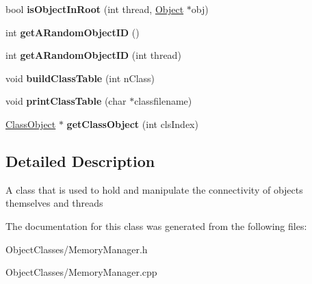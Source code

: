 \begin{DoxyCompactItemize}
\item 
\hypertarget{classtrace_gen_1_1_memory_manager_ae096928d0f0042ed5a44a7540dd36914}{}bool {\bfseries is\+Object\+In\+Root} (int thread, \hyperlink{classtrace_gen_1_1_object}{Object} $\ast$obj)\label{classtrace_gen_1_1_memory_manager_ae096928d0f0042ed5a44a7540dd36914}

\item 
\hypertarget{classtrace_gen_1_1_memory_manager_a8ec4d8aebc6678927dcabe19b6158449}{}int {\bfseries get\+A\+Random\+Object\+I\+D} ()\label{classtrace_gen_1_1_memory_manager_a8ec4d8aebc6678927dcabe19b6158449}

\item 
\hypertarget{classtrace_gen_1_1_memory_manager_a12c8c473bbe62e7c7b0f373c6c698094}{}int {\bfseries get\+A\+Random\+Object\+I\+D} (int thread)\label{classtrace_gen_1_1_memory_manager_a12c8c473bbe62e7c7b0f373c6c698094}

\item 
\hypertarget{classtrace_gen_1_1_memory_manager_a5626579f1a635a2d30fb37a326fed067}{}void {\bfseries build\+Class\+Table} (int n\+Class)\label{classtrace_gen_1_1_memory_manager_a5626579f1a635a2d30fb37a326fed067}

\item 
\hypertarget{classtrace_gen_1_1_memory_manager_a883654698c0b72656d0f2867c92bd8eb}{}void {\bfseries print\+Class\+Table} (char $\ast$classfilename)\label{classtrace_gen_1_1_memory_manager_a883654698c0b72656d0f2867c92bd8eb}

\item 
\hypertarget{classtrace_gen_1_1_memory_manager_a9c6924afe951101032f835befbdd6178}{}\hyperlink{classtrace_gen_1_1_class_object}{Class\+Object} $\ast$ {\bfseries get\+Class\+Object} (int cls\+Index)\label{classtrace_gen_1_1_memory_manager_a9c6924afe951101032f835befbdd6178}

\end{DoxyCompactItemize}


\subsection{Detailed Description}
A class that is used to hold and manipulate the connectivity of objects themselves and threads 

The documentation for this class was generated from the following files\+:\begin{DoxyCompactItemize}
\item 
Object\+Classes/Memory\+Manager.\+h\item 
Object\+Classes/Memory\+Manager.\+cpp\end{DoxyCompactItemize}
